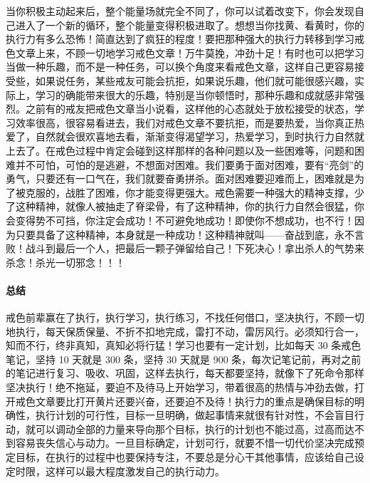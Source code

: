 当你积极主动起来后，整个能量场就完全不同了，你可以试着改变下，你会发现自己进入了一个新的循环，整个能量变得积极进取了。想想当你找黄、看黄时，你的执行力有多么恐怖！简直达到了疯狂的程度！要把那种强大的执行力转移到学习戒色文章上来，不顾一切地学习戒色文章！万牛莫挽，冲劲十足！有时也可以把学习当做一种乐趣，而不是一种任务，可以换个角度来看戒色文章，这样自己更容易接受些，如果说任务，某些戒友可能会抗拒，如果说乐趣，他们就可能很感兴趣，实际上，学习的确能带来很大的乐趣，特别是当你顿悟时，那种乐趣和成就感非常强烈。之前有的戒友把戒色文章当小说看，这样他的心态就处于放松接受的状态，学习效率很高，很容易看进去，我们对戒色文章不要抗拒，而是要热爱，当你真正热爱了，自然就会很欢喜地去看，渐渐变得渴望学习，热爱学习，到时执行力自然就上去了。在戒色过程中肯定会碰到这样那样的各种问题以及一些困难等，问题和困难并不可怕，可怕的是逃避，不想面对困难。我们要勇于面对困难，要有“亮剑”的勇气，只要还有一口气在，我们就要奋勇拼杀。面对困难要迎难而上，困难就是为了被克服的，战胜了困难，你才能变得更强大。戒色需要一种强大的精神支撑，少了这种精神，就像人被抽走了脊梁骨，有了这种精神，你的执行力自然会很猛，你会变得势不可挡，你注定会成功！不可避免地成功！即使你不想成功，也不行！因为只要具备了这种精神，本身就是一种成功！这种精神就叫——奋战到底，永不言败！战斗到最后一个人，把最后一颗子弹留给自己！下死决心！拿出杀人的气势来杀念！杀光一切邪念！！！

\paragraph*{总结}

戒色前辈赢在了执行，执行学习，执行练习，不找任何借口，坚决执行，不顾一切地执行，每天保质保量、不折不扣地完成，雷打不动，雷厉风行。必须知行合一，知而不行，终非真知，真知必将行猛！学习也要有一定计划，比如每天 30 条戒色笔记，坚持 10 天就是 300 条，坚持 30 天就是 900 条，每次记笔记前，再对之前的笔记进行复习、吸收、巩固，这样去执行，每天都要坚持，就像下了死命令那样坚决执行！绝不拖延，要迫不及待马上开始学习，带着很高的热情与冲劲去做，打开戒色文章要比打开黄片还要兴奋，还要迫不及待！执行力的重点是确保目标的明确性，执行计划的可行性，目标一旦明确，做起事情来就很有针对性，不会盲目行动，就可以调动全部的力量来导向那个目标，执行的计划也不能过高，过高而达不到容易丧失信心与动力。一旦目标确定，计划可行，就要不惜一切代价坚决完成预定目标，在执行的过程中也要保持专注，不要总是分心干其他事情，应该给自己设定时限，这样可以最大程度激发自己的执行动力。

